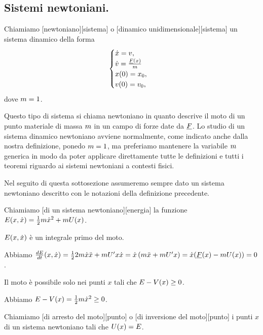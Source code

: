 \subsection{Sistemi newtoniani.}
\label{SistemiDinamici_SistemiNewtoniani}
\begin{Definition}
	Chiamiamo [newtoniano][sistema] o [dinamico unidimensionale][sistema] un sistema dinamico della forma
	$$\begin{cases}
		\dot{x} = v,\\
		\dot{v} = \frac{\underline{F}(x)}{m}\\
		x(0) = x_0,\\
		v(0) = v_0,
	\end{cases}$$
	dove $m = 1$. 
\end{Definition}
\par Questo tipo di sistema si chiama newtoniano in quanto descrive il moto di un punto materiale di massa $m$ in un campo di forze date da $\underline{F}$. Lo studio di un sistema dinamico newtoniano avviene normalmente, come indicato anche dalla nostra definizione, ponedo $m = 1$, ma preferiamo mantenere la variabile $m$ generica in modo da poter applicare direttamente tutte le definizioni e tutti i teoremi riguardo ai sistemi newtoniani a contesti fisici.
\par Nel seguito di questa sottosezione assumeremo sempre dato un sistema newtoniano descritto con le notazioni della definizione precedente.
\begin{Definition}
	Chiamiamo [di un sistema newtoniano][energia] la funzione $E(x,\dot{x}) = \frac{1}{2}m\dot{x}^2 + mU(x)$.
\end{Definition}
\begin{Theorem}
	$E(x,\dot{x})$ \`e un integrale primo del moto.
\end{Theorem}
\Proof Abbiamo $\frac{d E}{d t}(x,\dot{x}) = \frac{1}{2}2m\dot{x}\ddot{x} + mU'{x}\dot{x} = \dot{x} \left ( m\ddot{x} + mU'{x} \right ) = \dot{x} (\underline{F}(x) - mU(x)) = 0$. \EndProof
\begin{Theorem}
	Il moto \`e possibile solo nei punti $x$ tali che $E - V(x) \geq 0$.
\end{Theorem}
\Proof Abbiamo $E - V(x) = \frac{1}{2}m\dot{x}^2 \geq 0$. \EndProof
\begin{Definition}
	Chiamiamo [di arresto del moto][punto] o [di inversione del moto][punto] i punti $x$ di un sistema newtoniano tali che $U(x) = E$.
\end{Definition}
